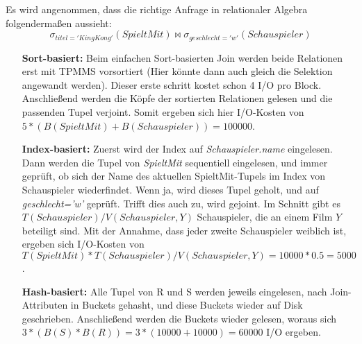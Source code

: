 \documentclass[12pt]{article}
\begin{document}
Es wird angenommen, dass die richtige Anfrage in relationaler Algebra folgendermaßen aussieht:
$$\sigma_{titel='King Kong'}(SpieltMit) \bowtie \sigma_{geschlecht='w'}(Schauspieler)$$
\newline
\begin{itemize}[leftmargin=5em]
    \item[\textbf{Sort-basiert:}] Beim einfachen Sort-basierten Join
        werden beide Relationen erst mit TPMMS vorsortiert (Hier könnte dann auch
        gleich die Selektion angewandt werden). Dieser erste schritt kostet
        schon 4 I/O pro Block. Anschließend werden die Köpfe der sortierten
        Relationen gelesen und die passenden Tupel verjoint. Somit ergeben sich
        hier I/O-Kosten von $5*(B(SpieltMit)+B(Schauspieler)) = 100000$.

    \item[\textbf{Index-basiert:}] Zuerst wird der Index auf
        \textit{Schauspieler.name} eingelesen. Dann werden die Tupel von
        \textit{SpieltMit} sequentiell eingelesen, und immer geprüft, ob sich
        der Name des aktuellen SpieltMit-Tupels im Index von Schauspieler
        wiederfindet. Wenn ja, wird dieses Tupel geholt, und auf
        \textit{geschlecht='w'} geprüft. Trifft dies auch zu, wird gejoint.
        Im Schnitt gibt es
        $T(Schauspieler)/V(Schauspieler,Y)$ Schauspieler, die
        an einem Film $Y$ beteiligt sind. Mit der Annahme, dass jeder
        zweite Schauspieler weiblich ist, ergeben sich I/O-Kosten
        von $T(SpieltMit)*T(Schauspieler)/V(Schauspieler,Y) = 10000*0.5 = 5000$.

    \item[\textbf{Hash-basiert:}] Alle Tupel von R und S werden jeweils
        eingelesen, nach Join-Attributen in Buckets gehasht, und diese Buckets
        wieder auf Disk geschrieben. Anschließend werden die Buckets wieder
        gelesen, woraus sich $3*(B(S)*B(R)) = 3*(10000+10000) = 60000$ I/O
        ergeben.
\end{itemize}
\end{document}
